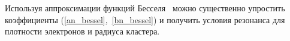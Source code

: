 Используя аппроксимации функций Бесселя~\cite{boren_huffman} можно существенно упростить коэффициенты (\ref{an_bessel},~\ref{bn_bessel}) и получить условия резонанса для плотности электронов и радиуса кластера. 
